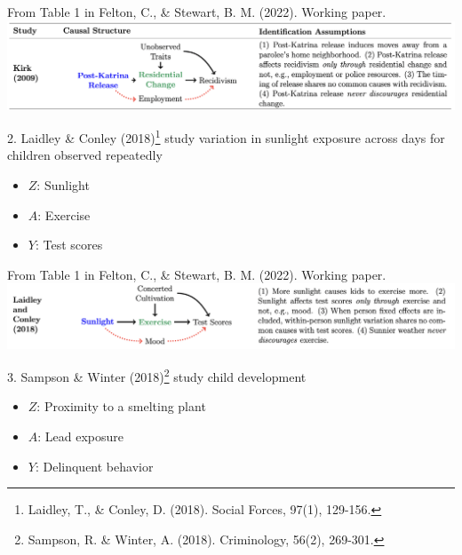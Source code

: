 \documentclass{beamer}
\newcommand\bref[2]{\href{#1}{\color{blue}{#2}}}
\begin{document}
\begin{frame}{\footnotesize From Table 1 in Felton, C., \& Stewart, B. M. (2022). Working paper.\\\bref{https://doi.org/10.31235/osf.io/3ua7q}{Handle with Care: A Sociologist's Guide to Causal Inference with Instrumental Variables.}}
\includegraphics[width = \textwidth]{figures/fs_tab1a}
\end{frame}

\begin{frame}

2. Laidley \& Conley (2018)\footnote{Laidley, T., \& Conley, D. (2018). \bref{https://academic.oup.com/sf/article-abstract/97/1/129/4960019}{The effects of active and passive leisure on cognition in children: Evidence from exogenous variation in weather.} Social Forces, 97(1), 129-156.} study variation in sunlight exposure across days for children observed repeatedly
\begin{itemize}
\item $Z$: Sunlight
\item $A$: Exercise
\item $Y$: Test scores
\end{itemize}

\end{frame}

\begin{frame}{\footnotesize From Table 1 in Felton, C., \& Stewart, B. M. (2022). Working paper.\\\bref{https://doi.org/10.31235/osf.io/3ua7q}{Handle with Care: A Sociologist's Guide to Causal Inference with Instrumental Variables.}}
\includegraphics[width = \textwidth]{figures/fs_tab1b}
\end{frame}

\begin{frame}

3. Sampson \& Winter (2018)\footnote{Sampson, R. \& Winter, A. (2018). \bref{https://doi.org/10.1111/1745-9125.12171}{Poisoned development: Assessing childhood lead exposure as a cause of crime in a birth cohort followed through adolescence.} Criminology, 56(2), 269-301.} study child development
\begin{itemize}
\item $Z$: Proximity to a smelting plant
\item $A$: Lead exposure
\item $Y$: Delinquent behavior
\end{itemize}

\end{frame}
\end{document}
